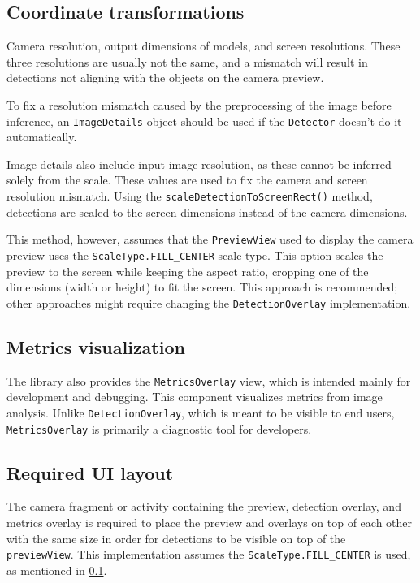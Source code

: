\subsection{Coordinate transformations}
\label{coordinateTransoformations}
Camera resolution, output dimensions of models, and screen resolutions. These three resolutions are usually not the same, and a mismatch will result in detections not aligning with the objects on the camera preview. 

To fix a resolution mismatch caused by the preprocessing of the image before inference, an \texttt{ImageDetails} object should be used if the \texttt{Detector} doesn't do it automatically.

Image details also include input image resolution, as these cannot be inferred solely from the scale. These values are used to fix the camera and screen resolution mismatch. Using the \texttt{scaleDetectionToScreenRect()} method, detections are scaled to the screen dimensions instead of the camera dimensions. 

This method, however, assumes that the \texttt{PreviewView} used to display the camera preview uses the \texttt{ScaleType.FILL\_CENTER} scale type. This option scales the preview to the screen while keeping the aspect ratio, cropping one of the dimensions (width or height) to fit the screen. This approach is recommended; other approaches might require changing the \texttt{DetectionOverlay} implementation.

\subsection{Metrics visualization}
The library also provides the \texttt{MetricsOverlay} view, which is intended mainly for development and debugging. This component visualizes metrics from image analysis. Unlike \texttt{DetectionOverlay}, which is meant to be visible to end users, \texttt{MetricsOverlay} is primarily a diagnostic tool for developers.


\subsection{Required UI layout}
\label{CameraFragmentOverlays}
The camera fragment or activity containing the preview, detection overlay, and metrics overlay is required to place the preview and overlays on top of each other with the same size in order for detections to be visible on top of the \texttt{previewView}. This implementation assumes the \texttt{ScaleType.FILL\_CENTER} is used, as mentioned in \ref{coordinateTransoformations}. 

